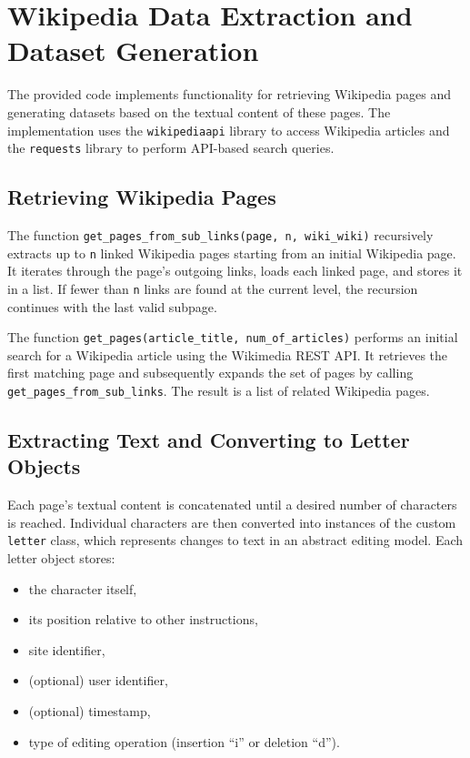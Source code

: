 \section{Wikipedia Data Extraction and Dataset Generation}

The provided code implements functionality for retrieving Wikipedia pages and generating datasets based on the textual content of these pages. The implementation uses the \texttt{wikipediaapi} library to access Wikipedia articles and the \texttt{requests} library to perform API-based search queries.

\subsection{Retrieving Wikipedia Pages}

The function \texttt{get\_pages\_from\_sub\_links(page, n, wiki\_wiki)} recursively extracts up to \texttt{n} linked Wikipedia pages starting from an initial Wikipedia page. It iterates through the page's outgoing links, loads each linked page, and stores it in a list. If fewer than \texttt{n} links are found at the current level, the recursion continues with the last valid subpage.

The function \texttt{get\_pages(article\_title, num\_of\_articles)} performs an initial search for a Wikipedia article using the Wikimedia REST API. It retrieves the first matching page and subsequently expands the set of pages by calling \texttt{get\_pages\_from\_sub\_links}. The result is a list of related Wikipedia pages.

\subsection{Extracting Text and Converting to Letter Objects}

Each page’s textual content is concatenated until a desired number of characters is reached. Individual characters are then converted into instances of the custom \texttt{letter} class, which represents changes to text in an abstract editing model. Each letter object stores:
\begin{itemize}
    \item the character itself,
    \item its position relative to other instructions,
    \item site identifier,
    \item (optional) user identifier,
    \item (optional) timestamp,
    \item type of editing operation (insertion ``i'' or deletion ``d'').
\end{itemize}

